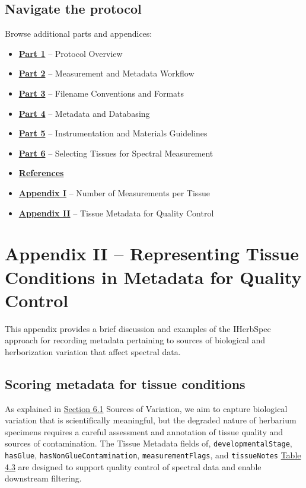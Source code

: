 \documentclass[
  letterpaper,
  DIV=11,
  numbers=noendperiod]{scrreprt}
\providecommand{\tightlist}{%
  \setlength{\itemsep}{0pt}\setlength{\parskip}{0pt}}
\begin{document}
\section{Navigate the protocol}\label{navigate-the-protocol-8}

Browse additional parts and appendices:

\begin{itemize}
\tightlist
\item
  \hyperref[part1]{\textbf{Part 1}} -- Protocol Overview
\item
  \hyperref[part2]{\textbf{Part 2}} -- Measurement and Metadata Workflow
\item
  \hyperref[part3]{\textbf{Part 3}} -- Filename Conventions and Formats
\item
  \hyperref[part4]{\textbf{Part 4}} -- Metadata and Databasing
\item
  \hyperref[part5]{\textbf{Part 5}} -- Instrumentation and Materials
  Guidelines
\item
  \hyperref[part6]{\textbf{Part 6}} -- Selecting Tissues for Spectral
  Measurement
\item
  \hyperref[references]{\textbf{References}}
\item
  \hyperref[app1]{\textbf{Appendix I}} -- Number of Measurements per
  Tissue
\item
  \hyperref[app2]{\textbf{Appendix II}} -- Tissue Metadata for Quality
  Control
\end{itemize}


\chapter{Appendix II -- Representing Tissue Conditions in Metadata for
Quality
Control}\label{appendix-ii-representing-tissue-conditions-in-metadata-for-quality-control}

This appendix provides a brief discussion and examples of the IHerbSpec
approach for recording metadata pertaining to sources of biological and
herborization variation that affect spectral data.

\section{Scoring metadata for tissue conditions}\label{app2}

As explained in
\hyperref[part-6-selecting-tissues-for-spectral-measurement]{Section
6.1} Sources of Variation, we aim to capture biological variation that
is scientifically meaningful, but the degraded nature of herbarium
specimens requires a careful assessment and annotation of tissue quality
and sources of contamination. The Tissue Metadata fields of,
\texttt{developmentalStage}, \texttt{hasGlue},
\texttt{hasNonGlueContamination}, \texttt{measurementFlags}, and
\texttt{tissueNotes} \hyperref[tbl-4-3]{Table 4.3} are designed to
support quality control of spectral data and enable downstream
filtering.
\end{document}
